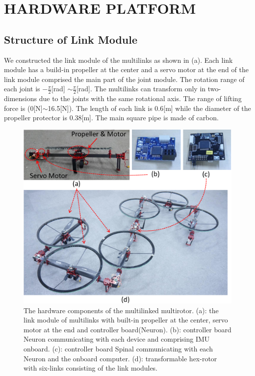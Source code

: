 \section{HARDWARE PLATFORM}
\subsection{Structure of Link Module}
We constructed the link module of the multilinks as shown in (a). Each link module has a build-in propeller at the center and a servo motor at the end of the link module comprised the main part of the joint module. The rotation range of each joint is $-\frac{\pi}{2}$[rad] $\sim \frac{\pi}{2}$[rad]. The multilinks can transform only in two-dimensions due to the joints with the same rotational axis. The range of lifting force is (0[N]$\sim$16.5[N]). The length of each link is 0.6[m] while the diameter of the propeller protector is 0.38[m]. The main square pipe is made of carbon.

\begin{figure}[t]
  \begin{center}
    \includegraphics[width=1.0\columnwidth]{figs/hardware.pdf}
  \end{center}
  \caption{The hardware components of the multilinked multirotor. (a): the link module of multilinks with built-in propeller at the center, servo motor at the end and controller board(Neuron). (b): controller board Neuron communicating with each device and comprising IMU onboard. (c): controller board Spinal communicating with each Neuron and the onboard computer. (d): transformable hex-rotor with six-links consisting of the link modules. \label{figure:hardware}}
\end{figure}

